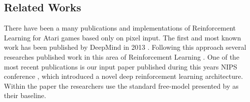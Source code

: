 \documentclass[10pt,twocolumn,letterpaper]{article}
\begin{document}
    \subsection{Related Works}
    There have been a many publications and implementations of Reinforcement Learning for Atari games based only on pixel input. The first and most known work has been published by DeepMind in 2013 \cite{DBLP:journals/corr/MnihKSGAWR13}. Following this approach several researches published work in this area of Reinforcement Learning \cite{guo2014deep,mnih2015human,schulman2015trust,hausknecht2015deep,DBLP:journals/corr/WangFL15}. One of the most recent publications is our input paper published during this years NIPS conference \cite{NIPS2017_7152}, which introduced a novel deep reinforcement learning architecture. Within the paper the researchers use the standard free-model presented by \cite{mnih2016asynchronous} as their baseline.
\end{document}
